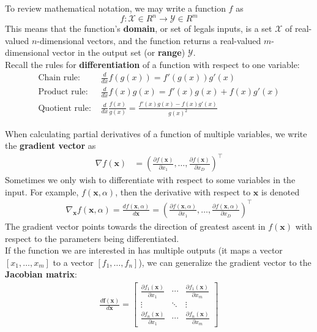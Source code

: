 \documentclass[12pt,letterpaper]{article}
\newcommand{\p}{\partial}
\begin{document}
To review mathematical notation, we may write a function $f$ as
$$f: \mathcal{X} \in R^n \to \mathcal{Y} \in R^m$$
This means that the function's {\bf{domain}}, or set of legals inputs, is a set $\mathcal{X}$ of real-valued $n$-dimensional vectors, and the function returns a real-valued $m$-dimensional vector in the output set (or {\bf{range}}) $\mathcal{Y}$. \\

\noindent Recall the rules for {\bf{differentiation}} of a function with respect to one variable:
\begin{align*}
\text{Chain rule: } & \frac{d}{d x} f(g(x))= f'(g(x))g'(x)\\
\text{Product rule: }& \frac{d}{d x} f(x)g(x) = f'(x)g(x) + f(x)g'(x)\\
\text{Quotient rule: }& \frac{d}{d x} \frac{f(x)}{g(x)} = \frac{f'(x)g(x) - f(x)g'(x)}{g(x)^2}
\end{align*}

\noindent When calculating partial derivatives of a function of multiple variables, we write the {\bf{gradient vector}} as
\begin{align*}
  \nabla f(\mathbf{x}) &= \left( \frac{\p f(\mathbf{x})}{\p x_1}, \dots, \frac{\p f(\mathbf{x})}{\p x_D} \right)^\top
\end{align*}
Sometimes we only wish to differentiate with respect to some variables in the input. For example, $f(\mathbf{x},\alpha)$, then the derivative with respect to $\mathbf{x}$ is denoted
\begin{align*}
  \nabla_{\mathbf{x}} f(\mathbf{x},\alpha) = \frac{d f(\mathbf{x},\alpha)}{d \mathbf{x}} = \left( \frac{\p f(\mathbf{x},\alpha)}{\p x_1}, \dots, \frac{\p f(\mathbf{x},\alpha)}{\p x_D} \right)^\top
\end{align*}
The gradient vector points towards the direction of greatest ascent in $f(\mathbf{x})$ with respect to the parameters being differentiated. \\

\noindent If the function we are interested in has multiple outputs (it maps a vector $[x_1, \dots, x_m]$ to a vector $[f_1, \dots, f_n]$), we can generalize the gradient vector to the {\bf{Jacobian matrix}}:
\begin{align*}
\frac{d \mathbf{f}(\mathbf{x})}{d \mathbf{x}} = \begin{bmatrix}
\frac{\p f_1(\mathbf{x})}{\p x_1} & \cdots & \frac{\p f_1(\mathbf{x})}{\p x_m} \\
\vdots & \ddots & \vdots \\
\frac{\p f_n(\mathbf{x})}{\p x_1} & \cdots & \frac{\p f_n(\mathbf{x})}{\p x_m}
\end{bmatrix}
\end{align*}
\end{document}
